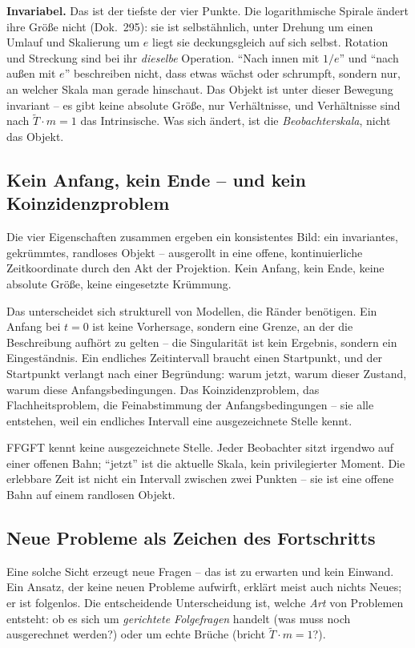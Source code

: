 \textbf{Invariabel.} Das ist der tiefste der vier Punkte. Die logarithmische
Spirale ändert ihre Größe nicht (Dok.~295): sie ist selbstähnlich, unter
Drehung um einen Umlauf und Skalierung um $e$ liegt sie deckungsgleich auf
sich selbst. Rotation und Streckung sind bei ihr \emph{dieselbe} Operation.
\enquote{Nach innen mit $1/e$} und \enquote{nach außen mit $e$} beschreiben
nicht, dass etwas wächst oder schrumpft, sondern nur, an welcher Skala man
gerade hinschaut. Das Objekt ist unter dieser Bewegung invariant -- es gibt
keine absolute Größe, nur Verhältnisse, und Verhältnisse sind nach
$\tilde{T} \cdot m = 1$ das Intrinsische. Was sich ändert, ist die
\emph{Beobachterskala}, nicht das Objekt.

\subsection*{Kein Anfang, kein Ende -- und kein Koinzidenzproblem}

Die vier Eigenschaften zusammen ergeben ein konsistentes Bild: ein
invariantes, gekrümmtes, randloses Objekt -- ausgerollt in eine offene,
kontinuierliche Zeitkoordinate durch den Akt der Projektion. Kein Anfang,
kein Ende, keine absolute Größe, keine eingesetzte Krümmung.

Das unterscheidet sich strukturell von Modellen, die Ränder benötigen. Ein
Anfang bei $t = 0$ ist keine Vorhersage, sondern eine Grenze, an der die
Beschreibung aufhört zu gelten -- die Singularität ist kein Ergebnis, sondern
ein Eingeständnis. Ein endliches Zeitintervall braucht einen Startpunkt, und
der Startpunkt verlangt nach einer Begründung: warum jetzt, warum dieser
Zustand, warum diese Anfangsbedingungen. Das Koinzidenzproblem, das
Flachheitsproblem, die Feinabstimmung der Anfangsbedingungen -- sie alle
entstehen, weil ein endliches Intervall eine ausgezeichnete Stelle kennt.

FFGFT kennt keine ausgezeichnete Stelle. Jeder Beobachter sitzt irgendwo auf
einer offenen Bahn; \enquote{jetzt} ist die aktuelle Skala, kein privilegierter
Moment. Die erlebbare Zeit ist nicht ein Intervall zwischen zwei Punkten --
sie ist eine offene Bahn auf einem randlosen Objekt.

\subsection*{Neue Probleme als Zeichen des Fortschritts}

Eine solche Sicht erzeugt neue Fragen -- das ist zu erwarten und kein
Einwand. Ein Ansatz, der keine neuen Probleme aufwirft, erklärt meist auch
nichts Neues; er ist folgenlos. Die entscheidende Unterscheidung ist, welche
\emph{Art} von Problemen entsteht: ob es sich um \emph{gerichtete
Folgefragen} handelt (was muss noch ausgerechnet werden?) oder um echte
Brüche (bricht $\tilde{T} \cdot m = 1$?).

